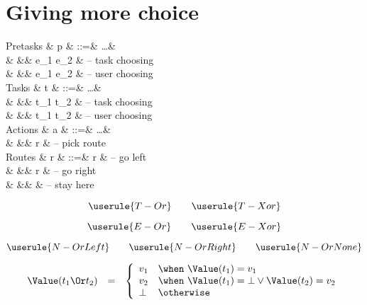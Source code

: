 
\section{Giving more choice}

\begin{grammar}
  Pretasks
    & p & ::=& \ldots       & \\
    &   &\mid& e_1 \Or e_2  & – task choosing \\
    &   &\mid& e_1 \Xor e_2 & – user choosing \\
  Tasks
    & t & ::=& \ldots       & \\
    &   &\mid& t_1 \Or t_2  & – task choosing \\
    &   &\mid& t_1 \Xor t_2 & – user choosing \\
  Actions
    & a & ::=& \ldots       & \\
    &   &\mid& \Pick r      & – pick route \\
  Routes
    & r & ::=& \Left r      & – go left \\
    &   &\mid& \Right r     & – go right \\
    &   &\mid& \Here        & – stay here \\
\end{grammar}

\begin{equation*}
  \userule{T-Or} \qquad \userule{T-Xor}
\end{equation*}

\begin{equation*}
  \userule{E-Or} \qquad \userule{E-Xor}
\end{equation*}

\begin{equation*}
  \userule{N-OrLeft} \qquad \userule{N-OrRight} \qquad \userule{N-OrNone}
\end{equation*}

\begin{equation*}
  \begin{array}{lcl}
    \Value(t_1 \Or t_2) &=& \left\{
      \begin{array}{ll}
        v_1  & \when\ \Value(t_1) = v_1 \\
        v_2  & \when\ \Value(t_1) = \bot \lor \Value(t_2) = v_2 \\
        \bot & \otherwise
      \end{array}
    \right.
  \end{array}
\end{equation*}

